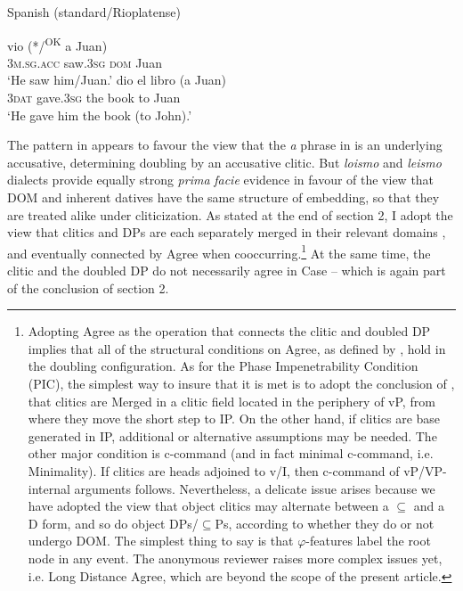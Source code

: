 \documentclass[output=paper]{langscibook}
\begin{document}
\ea\label{ex:manzini:}
Spanish (standard/Rioplatense)\\
\begin{xlist}
\ex {}     {vio}    (*/\textsuperscript{OK} {a} Juan)\\
\textsc{3m.sg.acc}  saw.\textsc{3sg}  \textsc{dom} Juan\\
\glt ‘He saw him/Juan.’
\ex {}   {dio}     {el} {libro}   (a Juan)\\
\textsc{3dat}   gave.\textsc{3sg}  the book   to Juan\\
\glt ‘He gave him the book (to John).’
\end{xlist}
\z


The pattern in  appears to favour the view that the \textit{a} phrase in  is an underlying accusative, determining doubling by an accusative clitic. But \textit{loismo} and \textit{leismo} dialects provide equally strong \textit{prima} \textit{facie} evidence in favour of the view that DOM and inherent datives have the same structure of embedding, so that they are treated alike under cliticization. As stated at the end of section 2, I adopt the view that clitics and DPs are each separately merged in their relevant domains \citep{Sportiche1996}, and eventually connected by  Agree when cooccurring.\footnote{Adopting Agree as the operation that connects the clitic and doubled DP implies that all of the structural conditions on Agree, as defined by \citet{Chomsky2000}, hold in the doubling configuration. As for the Phase Impenetrability Condition (PIC), the simplest way to insure that it is met is to adopt the conclusion of \citet{Sportiche1996}, that clitics are Merged in a clitic field located in the periphery of vP, from where they move the short step to IP. On the other hand, if clitics are base generated in IP, additional or alternative assumptions may be needed. The other major condition is c-command (and in fact minimal c-command, i.e. Minimality). If clitics are heads adjoined to v/I, then c-command of vP/VP-internal arguments follows. Nevertheless, a delicate issue arises because we have adopted the view that object clitics may alternate between a \textrm{${\subseteq}$} and a D form, and so do object DPs/\textrm{${\subseteq}$}Ps, according to whether they do or not undergo DOM.  The simplest thing to say is that $\varphi $-features label the root node in any event. The anonymous reviewer raises more complex issues yet, i.e. Long Distance Agree, which are beyond the scope of the present article.}{} At the same time, the clitic and the doubled DP do not necessarily agree in Case – which is again part of the conclusion of section 2. 
\end{document}
